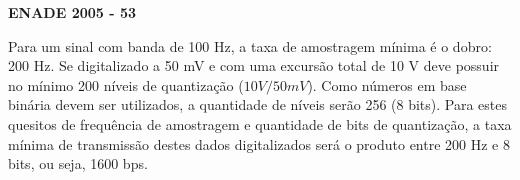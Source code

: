 \textbf{ENADE 2005 - 53}

Para um sinal com banda de 100 Hz, a taxa de amostragem mínima é o dobro: 200 Hz. Se digitalizado a 50 mV e com uma excursão total de 10 V deve possuir no mínimo 200 níveis de quantização ($10V/50mV$). Como números em base binária devem ser utilizados, a quantidade de níveis serão 256 (8 bits). Para estes quesitos de frequência de amostragem e quantidade de bits de quantização, a taxa mínima de transmissão destes dados digitalizados será o produto entre 200 Hz e 8 bits, ou seja, 1600 bps.